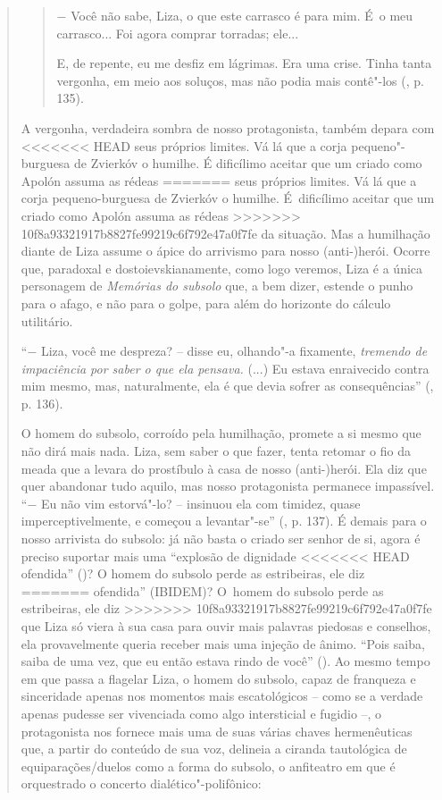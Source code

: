 {\begin{quote}
\begin{quote}
− Você não sabe, Liza, o que este carrasco é para mim. É~o meu
carrasco... Foi agora comprar torradas; ele...

E, de repente, eu me desfiz em lágrimas. Era uma crise. Tinha tanta
vergonha, em meio aos soluços, mas não podia mais contê"-los (, p.
135).
\end{quote}

A vergonha, verdadeira sombra de nosso protagonista, também depara com
<<<<<<< HEAD
seus próprios limites. Vá lá que a corja pequeno"-burguesa de Zvierkóv o
humilhe. É dificílimo aceitar que um criado como Apolón assuma as rédeas
=======
seus próprios limites. Vá lá que a corja pequeno-burguesa de Zvierkóv o
humilhe. É~dificílimo aceitar que um criado como Apolón assuma as rédeas
>>>>>>> 10f8a93321917b8827fe99219c6f792e47a0f7fe
da situação. Mas a humilhação diante de Liza assume o ápice do arrivismo
para nosso (anti-)herói. Ocorre que, paradoxal e dostoievskianamente,
como logo veremos, Liza é a única personagem de \emph{Memórias do
subsolo} que, a bem dizer, estende o punho para o afago, e não para o
golpe, para além do horizonte do cálculo utilitário.

``− Liza, você me despreza? -- disse eu, olhando"-a fixamente,
\emph{tremendo de impaciência por saber o que ela pensava.} (...) Eu
estava enraivecido contra mim mesmo, mas, naturalmente, ela é que devia
sofrer as consequências'' (, p. 136).

O homem do subsolo, corroído pela humilhação, promete a si mesmo que não
dirá mais nada. Liza, sem saber o que fazer, tenta retomar o fio da
meada que a levara do prostíbulo à casa de nosso (anti-)herói. Ela diz
que quer abandonar tudo aquilo, mas nosso protagonista permanece
impassível. ``− Eu não vim estorvá"-lo? -- insinuou ela com timidez,
quase imperceptivelmente, e começou a levantar"-se'' (, p. 137). É
demais para o nosso arrivista do subsolo: já não basta o criado ser
senhor de si, agora é preciso suportar mais uma ``explosão de dignidade
<<<<<<< HEAD
ofendida'' ()? O homem do subsolo perde as estribeiras, ele diz
=======
ofendida'' (IBIDEM)? O~homem do subsolo perde as estribeiras, ele diz
>>>>>>> 10f8a93321917b8827fe99219c6f792e47a0f7fe
que Liza só viera à sua casa para ouvir mais palavras piedosas e
conselhos, ela provavelmente queria receber mais uma injeção de ânimo.
``Pois saiba, saiba de uma vez, que eu então estava rindo de você''
(). Ao mesmo tempo em que passa a flagelar Liza, o homem do
subsolo, capaz de franqueza e sinceridade apenas nos momentos mais
escatológicos -- como se a verdade apenas pudesse ser vivenciada como
algo intersticial e fugidio --, o protagonista nos fornece mais uma de
suas várias chaves hermenêuticas que, a partir do conteúdo de sua voz,
delineia a ciranda tautológica de equiparações/duelos como a forma do
subsolo, o anfiteatro em que é orquestrado o concerto
dialético"-polifônico:


\end{quote}}
